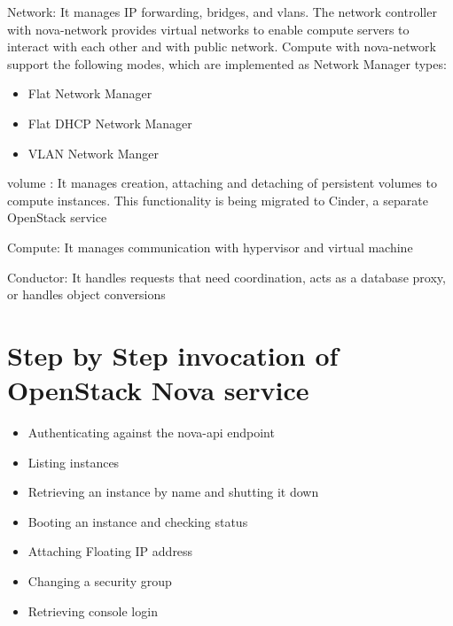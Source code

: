 \documentclass[9pt,twocolumn,twoside]{styles/osajnl}
\begin{document}
\begin{flushleft}

Network: It manages IP forwarding, bridges, and vlans. The network controller with nova-network provides virtual networks to enable compute servers to interact with each other and with public network. Compute with nova-network support the following modes, which are implemented as Network Manager types:
\begin{itemize}

\item Flat Network Manager

\item Flat DHCP Network Manager

\item VLAN Network Manger

\end{itemize}

\end{flushleft}


\begin{flushleft}

volume : It manages creation, attaching and detaching of persistent volumes to compute instances. This functionality is being migrated to Cinder, a separate OpenStack service

\end{flushleft}


\begin{flushleft}
Compute: It manages communication with hypervisor and virtual machine

\end{flushleft}


\begin{flushleft}

Conductor: It handles requests that need coordination, acts as a database proxy, or handles object conversions

\end{flushleft}




\section{Step by Step invocation of OpenStack Nova service}

\begin{itemize}

\item Authenticating against the nova-api endpoint

\item Listing instances

\item Retrieving an instance by name and shutting it down

\item Booting an instance and checking status

\item Attaching Floating IP address

\item Changing a security group 

\item Retrieving console login

\end{itemize}
\end{document}
